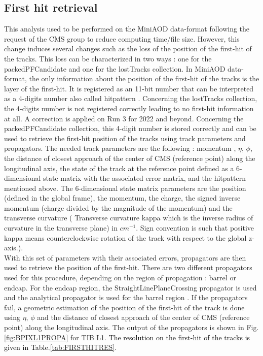 \documentclass{cernatlasnote}
\begin{document}
\subsection{First hit retrieval}
\label{APP: FIRSTHIT}
This analysis used to be performed on the  MiniAOD data-format following the request of the CMS group to reduce computing time/file size. However, this change induces several changes such as the loss of the position of the first-hit of the tracks. This loss can be characterized in two ways : one for the packedPFCandidate and one for the lostTracks collection. In MiniAOD data-format, the only information about the position of the first-hit of the tracks is the layer of the first-hit. It is registered as an 11-bit number that can be interpreted as a 4-digits number also called hitpattern \cite{HP}. Concerning the lostTracks collection, the 4-digits number is not registered correctly leading to no first-hit information at all. A correction is applied on Run 3 for 2022 and beyond. Concerning the packedPFCandidate collection, this 4-digit number is stored correctly and can be used to retrieve the first-hit position of the tracks using track parameters and propagators. The needed track parameters are the following : momentum , $\eta$, $\phi$, the distance of closest approach of the center of CMS (reference point) along the longitudinal axis, the state of the track at the reference point defined as a 6-dimensional state matrix with the associated error matrix, and the hitpattern mentioned above. The 6-dimensional state matrix parameters are the position (defined in the global frame), the momentum, the charge, the signed inverse momentum (charge divided by the magnitude of the momentum) and the transverse curvature ( Transverse curvature kappa which is the inverse radius of curvature in the transverse plane) in $cm^{-1}$. Sign convention is such that positive kappa means counterclockwise rotation of the track with respect to the global z-axis.). \\

With this set of parameters with their associated errors, propagators are then used to retrieve the position of the first-hit. There are two different propagators used for this procedure, depending on the region of propagation : barrel or endcap. For the endcap region, the StraightLinePlaneCrossing propagator is used and the analytical propagator is used for the barrel region \cite{PROP}. If the propagators fail, a geometric estimation of the position of the first-hit of the track is done using $\eta$, $\phi$ and the distance of closest approach of the center of CMS (reference point) along the longitudinal axis. The output of the propagators is shown in Fig.\ref{fig:BPIXL1PROPA} for TIB L1. \textcolor{black}{The resolution on the first-hit of the tracks is given in Table.\ref{tab:FIRSTHITRES}}.
\end{document}
